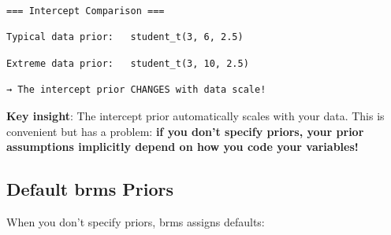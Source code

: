 \documentclass[
  11pt,
]{article}
\begin{document}
\begin{verbatim}

=== Intercept Comparison ===
\end{verbatim}

\begin{verbatim}
Typical data prior:   student_t(3, 6, 2.5) 
\end{verbatim}

\begin{verbatim}
Extreme data prior:   student_t(3, 10, 2.5) 
\end{verbatim}

\begin{verbatim}
→ The intercept prior CHANGES with data scale!
\end{verbatim}

\textbf{Key insight}: The intercept prior automatically scales with your
data. This is convenient but has a problem: \textbf{if you don't specify
priors, your prior assumptions implicitly depend on how you code your
variables!}

\subsection{Default brms Priors}\label{default-brms-priors}

When you don't specify priors, brms assigns defaults:
\end{document}
